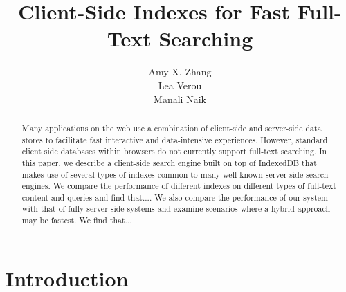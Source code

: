 \documentclass{vldb}
\begin{document}

\title{Client-Side Indexes for Fast Full-Text Searching}




\author{
\alignauthor
Amy X. Zhang\\
\alignauthor Lea Verou\\
\alignauthor Manali Naik\\
}

\maketitle

\begin{abstract}

Many applications on the web use a combination of client-side and server-side data stores to facilitate fast interactive and data-intensive experiences. 
However, standard client side databases within browsers do not currently support full-text searching. 
In this paper, we describe a client-side search engine built on top of IndexedDB that makes use of several types of indexes common to many well-known server-side search engines.
We compare the performance of different indexes on different types of full-text content and queries and find that....
We also compare the performance of our system with that of fully server side systems and examine scenarios where a hybrid approach may be fastest. We find that...

\end{abstract}

\section{Introduction}
\end{document}
